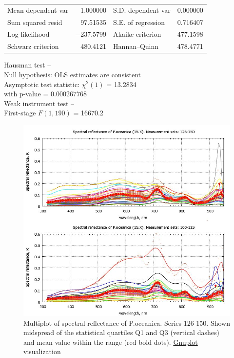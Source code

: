 \documentclass[10pt, a4paper]{article}
\begin{document}
\begin{appendices}
\begin{table}[htbp]
\begin{center}
	\vspace{1ex}
	\begin{tabular}{lrlr}
		Mean dependent var &  1.000000 & S.D. dependent var &  0.000000 \\
		Sum squared resid &  97.51535 & S.E. of regression &  0.716407 \\
		Log-likelihood & $-$237.5799 & Akaike criterion &  477.1598 \\
		Schwarz criterion &  480.4121 & Hannan--Quinn &  478.4771 \\
	\end{tabular}

	\vspace{1em}
	\begin{raggedright}
		Hausman test --\\
		\quad Null hypothesis: OLS estimates are consistent\\
		\quad Asymptotic test statistic: $\chi^2(1)$ = 13.2834\\
		\quad with p-value = 0.000267768\\
	\vspace{1ex}
		Weak instrument test -- \\
		\quad First-stage $F(1, 190)$ = 16670.2 \\
	\end{raggedright}

	\end{center}
	\label{tab:18}
\end{table}

\begin{figure}[H]
	\begin{center}
		\includegraphics[scale=0.4]{GNU-14.jpg}
		\caption{Multiplot of spectral reflectance of P.oceanica. Series 126-150. Shown midspread of the statistical quartiles Q1 and Q3 (vertical dashes) and mean value within the range (red bold dots). \href{http://www.gnuplot.info/}{Gnuplot} visualization­}
		\label{fig:58}
	\end{center}
\end{figure}


\end{appendices}
\end{document}
